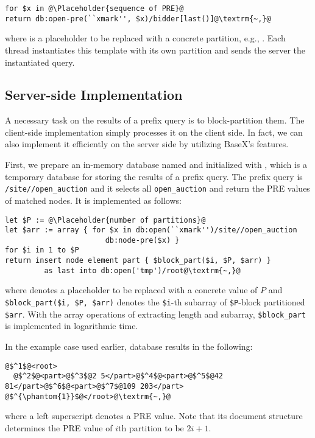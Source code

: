 \vspace{10mm}
\begin{lstlisting}[escapechar=\@]
for $x in @\Placeholder{sequence of PRE}@
return db:open-pre(``xmark'', $x)/bidder[last()]@\textrm{~,}@
\end{lstlisting}
where  is a placeholder to be replaced with a
concrete partition, e.g., . Each thread instantiates this template
with its own partition and sends the server the instantiated query.


\subsection{Server-side Implementation}

A necessary task on the results of a prefix query is to block-partition them.
The client-side implementation simply processes it on the client side. In fact,
we can also implement it efficiently on the server side by utilizing BaseX's
features.

First, we prepare an in-memory database named  and initialized with
, which is a temporary database for storing the results of a
prefix query.  The prefix query is \texttt{/site//open\_auction} and it selects 
all \texttt{open\_auction} and return the PRE values of matched nodes. 
It is implemented as follows:

\begin{lstlisting}[escapechar=\@]
let $P := @\Placeholder{number of partitions}@
let $arr := array { for $x in db:open(``xmark'')/site//open_auction
                       db:node-pre($x) }
for $i in 1 to $P
return insert node element part { $block_part($i, $P, $arr) }
         as last into db:open('tmp')/root@\textrm{~,}@
\end{lstlisting}
where  denotes a placeholder to be replaced
with a concrete value of $P$ and \verb|$block_part($i, $P, $arr)| denotes the
\verb|$i|-th subarray of \verb|$P|-block partitioned \verb|$arr|. With the array
operations of extracting length and subarray, \verb|$block_part| is implemented
in logarithmic time.

In the example case used earlier,  database results in the following:
\newpage
\begin{lstlisting}[escapechar=\@]
@$^1$@<root>
  @$^2$@<part>@$^3$@2 5</part>@$^4$@<part>@$^5$@42 81</part>@$^6$@<part>@$^7$@109 203</part>
@$^{\phantom{1}}$@</root>@\textrm{~,}@
\end{lstlisting}
where a left superscript denotes a PRE value. Note that its document structure
determines the PRE value of $i$th partition to be $2i+1$.

